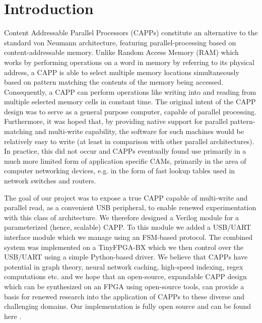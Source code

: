 \section{Introduction}
Content Addressable Parallel Processors (CAPPs) constitute an alternative to the standard von Neumann architecture, featuring parallel-processing based on content-addressable memory. Unlike Random Access Memory (RAM) which works by performing operations on a word in memory by referring to its physical address, a CAPP is able to select multiple memory locations simultaneously based on pattern matching the contents of the memory being accessed. Consequently, a CAPP can perform operations like writing into and reading from multiple selected memory cells in constant time. The original intent of the CAPP design was to serve as a general purpose computer, capable of parallel processing. Furthermore, it was hoped that, by providing native support for parallel pattern-matching and multi-write capability, the software for such machines would be relatively easy to write (at least in comparison with other parallel architectures). In practice, this did not occur and CAPPs eventually found use primarily in a much more limited form of application specific CAMs, primarily in the area of computer networking devices, e.g. in the form of fast lookup tables used in network switches and routers.

The goal of our project was to expose a true CAPP capable of multi-write and parallel read, as a convenient USB peripheral, to enable renewed experimentation with this class of architecture. We therefore designed a Verilog module for a parameterized (hence, scalable) CAPP. To this module we added a USB/UART interface module which we manage using an FSM-based protocol. The combined system was implemented on a TinyFPGA-BX \cite{tinyfpga_bx} which we then control over the USB/UART using a simple Python-based driver. We believe that CAPPs have potential in graph theory, neural network caching, high-speed indexing, regex computations etc. and we hope that an open-source, expandable CAPP design which can be synthesized on an FPGA using open-source tools, can provide a basis for renewed research into the application of CAPPs to these diverse and challenging domains. Our implementation is fully open source and can be found here \cite{CAPP_FPGA}.
